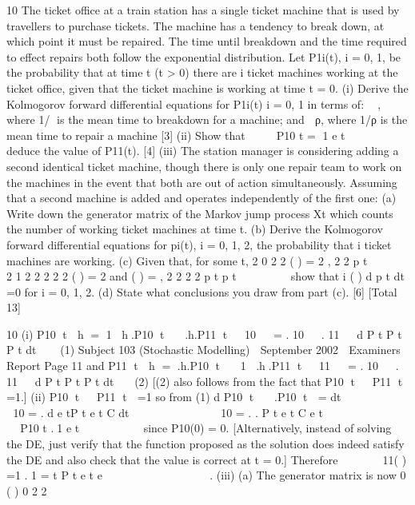 
10 The ticket office at a train station has a single ticket machine that is used by travellers
to purchase tickets.
The machine has a tendency to break down, at which point it must be repaired. The
time until breakdown and the time required to effect repairs both follow the
exponential distribution.
Let P1i(t), i = 0, 1, be the probability that at time t (t > 0) there are i ticket machines
working at the ticket office, given that the ticket machine is working at time t = 0.
(i) Derive the Kolmogorov forward differential equations for P1i(t) i = 0, 1 in
terms of:
  , where 1/ is the mean time to breakdown for a machine; and
  ρ, where 1/ρ is the mean time to repair a machine [3]
(ii) Show that     P10 t = 1 e t    


deduce the value of P11(t). [4]
(iii) The station manager is considering adding a second identical ticket machine,
though there is only one repair team to work on the machines in the event that
both are out of action simultaneously. Assuming that a second machine is
added and operates independently of the first one:
(a) Write down the generator matrix of the Markov jump process Xt which
counts the number of working ticket machines at time t.
(b) Derive the Kolmogorov forward differential equations for pi(t), i = 0,
1, 2, the probability that i ticket machines are working.
(c) Given that, for some t,
2
0 2 2
( ) = 2 ,
2 2
p t 
  
2
1 2 2 2 2 2
( ) = 2 and ( ) = ,
2 2 2 2
p t p t  
     
show that i ( )
d p t
dt
=0 for i = 0, 1, 2.
(d) State what conclusions you draw from part (c). [6]
[Total 13]


10 (i) P10 t  h = 1 h.P10 t   .h.P11 t 
 10   = . 10   . 11   d P t P t P t
dt   (1)
Subject 103 (Stochastic Modelling)  September 2002  Examiners Report
Page 11
and
P11 t  h = .h.P10 t   1 .h.P11 t 
 11   = . 10   . 11   d P t P t P t
dt   (2)
[(2) also follows from the fact that P10 t   P11 t  =1.]
(ii) P10 t   P11 t  =1
so from (1) d P10 t   .P10 t  =
dt   

     
10 = . d e tP t e t C
dt
 
 
      
10 = . . P t e t C e t    


     P10 t .1 e t    
 

since P10(0) = 0.
[Alternatively, instead of solving the DE, just verify that the function
proposed as the solution does indeed satisfy the DE and also check that the
value is correct at t = 0.]
Therefore
   
 
11( ) =1 . 1 =
t
P t e t e
 
     
 
 
.
(iii) (a) The generator matrix is now
0
( )
0 2 2
   
         
    	 

